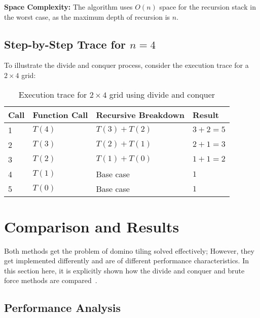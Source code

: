 \documentclass[conference]{IEEEtran}
\begin{document}
\textbf{Space Complexity:} The algorithm uses $O(n)$ space for the recursion stack in the worst case, as the maximum depth of recursion is $n$.

\subsection{Step-by-Step Trace for $n = 4$}

To illustrate the divide and conquer process, consider the execution trace for a $2 \times 4$ grid:

\begin{table}[htbp]
\centering
\caption{Execution trace for $2 \times 4$ grid using divide and conquer}
\label{tab:dc_trace}
\renewcommand{\arraystretch}{2}
\begin{tabular}{|p{1.5cm}|p{2.0cm}|p{2.0cm}|p{1.5cm}|}
\hline
\textbf{Call} & \textbf{Function Call} & \textbf{Recursive Breakdown} & \textbf{Result} \\
\hline
1 & $T(4)$ & $T(3) + T(2)$ & $3 + 2 = 5$ \\
\hline
2 & $T(3)$ & $T(2) + T(1)$ & $2 + 1 = 3$ \\
\hline
3 & $T(2)$ & $T(1) + T(0)$ & $1 + 1 = 2$ \\
\hline
4 & $T(1)$ & Base case & $1$ \\
\hline
5 & $T(0)$ & Base case & $1$ \\
\hline
\end{tabular}
\end{table}

\section{Comparison and Results}

Both methods get the problem of domino tiling solved effectively; However, they get implemented differently and are of different performance characteristics. In this section here, it is explicitly shown how the divide and conquer and brute force methods are compared~\cite{b4, b5}.

\subsection{Performance Analysis}
\end{document}
